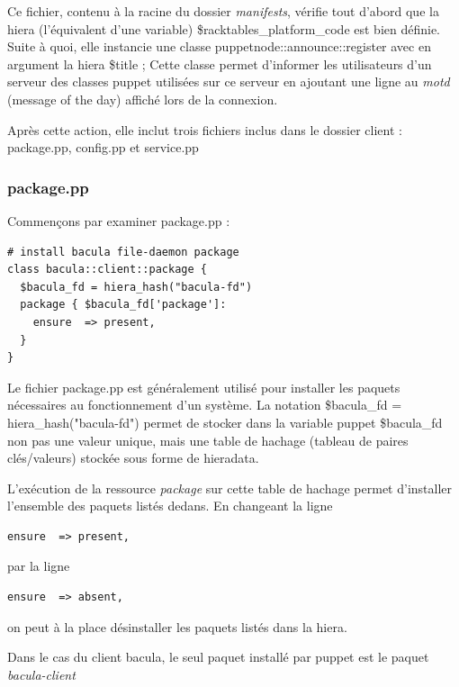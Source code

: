 \documentclass[14 pt,a4paper]{extreport}
\begin{document}
Ce fichier, contenu à la racine du dossier \emph{manifests}, vérifie tout d'abord que la hiera (l'équivalent d'une variable) \$racktables\_platform\_code est bien définie. Suite à quoi, elle instancie une classe puppetnode::announce::register avec en argument la hiera \$title ; Cette classe permet d'informer les utilisateurs d'un serveur des classes puppet utilisées sur ce serveur en ajoutant une ligne au \emph{motd} (message of the day) affiché lors de la connexion.

Après cette action, elle inclut trois fichiers inclus dans le dossier client : package.pp, config.pp et service.pp

\subsubsection*{package.pp}

Commençons par examiner package.pp :

\begin{framed}
\begin{Verbatim}[fontsize=\scriptsize]
# install bacula file-daemon package
class bacula::client::package {
  $bacula_fd = hiera_hash("bacula-fd")
  package { $bacula_fd['package']:
    ensure  => present,
  }
}\end{Verbatim}
\end{framed}

Le fichier package.pp est généralement utilisé pour installer les paquets nécessaires au fonctionnement d'un système. La notation \$bacula\_fd = hiera\_hash("bacula-fd") permet de stocker dans la variable puppet \$bacula\_fd non pas une valeur unique, mais une table de hachage (tableau de paires clés/valeurs) stockée sous forme de hieradata.

L'exécution de la ressource \emph{package} sur cette table de hachage permet d'installer l'ensemble des paquets listés dedans. En changeant la ligne
\begin{Verbatim}[fontsize=\scriptsize]
    ensure  => present,
\end{Verbatim}

par la ligne

\begin{Verbatim}[fontsize=\scriptsize]
    ensure  => absent,
\end{Verbatim}
on peut à la place désinstaller les paquets listés dans la hiera.

Dans le cas du client bacula, le seul paquet installé par puppet est le paquet \emph{bacula-client}
\end{document}
